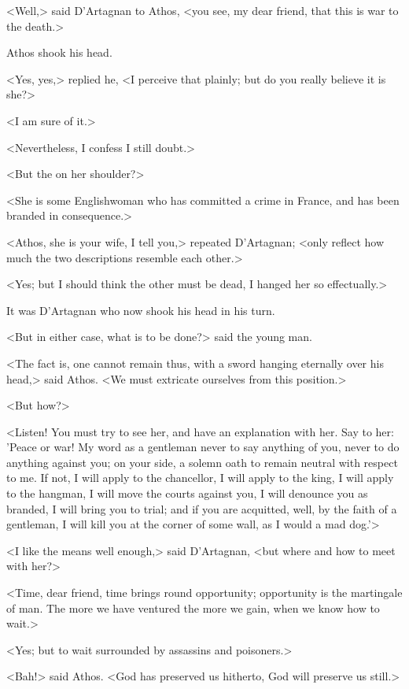 <Well,> said D'Artagnan to Athos, <you see, my dear friend, that this is war to the death.> 

Athos shook his head. 

<Yes, yes,> replied he, <I perceive that plainly; but do you really believe it is she?> 

<I am sure of it.> 

<Nevertheless, I confess I still doubt.> 

<But the  on her shoulder?> 

<She is some Englishwoman who has committed a crime in France, and has been branded in consequence.> 

<Athos, she is your wife, I tell you,> repeated D'Artagnan; <only reflect how much the two descriptions resemble each other.> 

<Yes; but I should think the other must be dead, I hanged her so effectually.> 

It was D'Artagnan who now shook his head in his turn. 

<But in either case, what is to be done?> said the young man. 

<The fact is, one cannot remain thus, with a sword hanging eternally over his head,> said Athos. <We must extricate ourselves from this position.> 

<But how?> 

<Listen! You must try to see her, and have an explanation with her. Say to her: 'Peace or war! My word as a gentleman never to say anything of you, never to do anything against you; on your side, a solemn oath to remain neutral with respect to me. If not, I will apply to the chancellor, I will apply to the king, I will apply to the hangman, I will move the courts against you, I will denounce you as branded, I will bring you to trial; and if you are acquitted, well, by the faith of a gentleman, I will kill you at the corner of some wall, as I would a mad dog.'> 

<I like the means well enough,> said D'Artagnan, <but where and how to meet with her?> 

<Time, dear friend, time brings round opportunity; opportunity is the martingale of man. The more we have ventured the more we gain, when we know how to wait.> 

<Yes; but to wait surrounded by assassins and poisoners.> 

<Bah!> said Athos. <God has preserved us hitherto, God will preserve us still.> 


